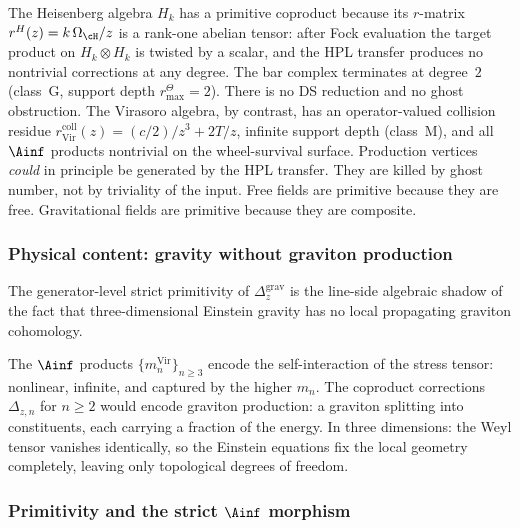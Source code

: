 \begin{remark}
\label{rem:heisenberg-primitive}
The Heisenberg algebra $H_k$ has a primitive coproduct because
its $r$-matrix $r^H(z)=k\,\Omega_{\cH}/z$ is a rank-one
abelian tensor: after Fock evaluation the target
product on $H_k \otimes H_k$ is twisted by a scalar, and
the HPL transfer produces no nontrivial corrections at any
degree. The bar complex terminates at degree~$2$ (class~G,
support depth \(r^\Theta_{\max}=2\)). There is no DS reduction and
no ghost obstruction. The Virasoro algebra, by contrast, has
an operator-valued collision residue
\(r_{\mathrm{Vir}}^{\mathrm{coll}}(z) = (c/2)/z^3 + 2T/z\), infinite support
depth (class~M), and all $\Ainf$ products nontrivial on the
wheel-survival surface.
Production vertices \emph{could} in principle be generated by
the HPL transfer. They are killed by ghost number, not by
triviality of the input. Free fields are primitive because
they are free. Gravitational fields are primitive because they
are composite.
\end{remark}

\subsubsection*{Physical content: gravity without graviton
 production}

The generator-level strict primitivity of
\(\Delta_z^{\mathrm{grav}}\) is the line-side algebraic shadow of the
fact that three-dimensional Einstein gravity has no local propagating
graviton cohomology.

The $\Ainf$ products
$\{m_n^{\mathrm{Vir}}\}_{n \ge 3}$ encode the self-interaction
of the stress tensor: nonlinear, infinite, and captured by the
higher $m_n$.
The coproduct corrections $\Delta_{z,n}$ for $n \ge 2$ would
encode graviton production: a graviton splitting into
constituents, each carrying a fraction of the energy. In three
dimensions: the Weyl tensor vanishes identically, so the
Einstein equations fix the local geometry completely, leaving
only topological degrees of freedom.

\subsubsection*{Primitivity and the strict $\Ainf$ morphism}
\label{par:primitive-strict-morphism}

